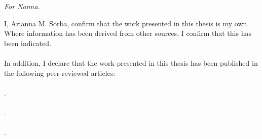 \maketitle

\chapter*{}
\begin{flushright}
\textit{For Nonna.}
\end{flushright}

\begin{declaration} %
I, Arianna M. Sorba, confirm that the work presented in this thesis is my own.
Where information has been derived from other sources, I confirm that this has been indicated.
\\
\\
In addition, I declare that the work presented in this thesis has been published in the following peer-reviewed articles:
\\
\\
.
\\
\\
.
\\
\\
.

\end{declaration}

